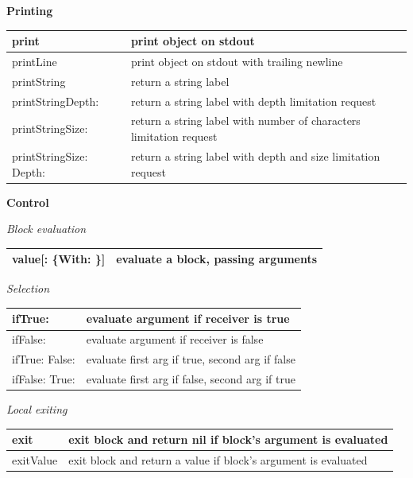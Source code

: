 \documentclass[letterpaper,10pt,english]{sphinxmanual}
\begin{document}
\textbf{Printing}

\begin{tabulary}{\linewidth}{p{5cm} p{10cm}}
\hline

print
 & 
print object on stdout
\\\hline

printLine
 & 
print object on stdout with trailing newline
\\\hline

printString
 & 
return a string label
\\\hline

printStringDepth:
 & 
return a string label with depth limitation request
\\\hline

printStringSize:
 & 
return a string label with number of characters limitation request
\\\hline

printStringSize: Depth:
 & 
return a string label with depth and size limitation request
\\\hline
\end{tabulary}


\textbf{Control}

\emph{Block evaluation}

\begin{tabulary}{\linewidth}{p{5cm} p{10cm}}
\hline

value{[}: \{With: \}{]}
 & 
evaluate a block, passing arguments
\\\hline
\end{tabulary}


\emph{Selection}

\begin{tabulary}{\linewidth}{p{5cm} p{10cm}}
\hline

ifTrue:
 & 
evaluate argument if receiver is true
\\\hline

ifFalse:
 & 
evaluate argument if receiver is false
\\\hline

ifTrue: False:
 & 
evaluate first arg if true, second arg if false
\\\hline

ifFalse: True:
 & 
evaluate first arg if false, second arg if true
\\\hline
\end{tabulary}


\emph{Local exiting}

\begin{tabulary}{\linewidth}{p{5cm} p{10cm}}
\hline

exit
 & 
exit block and return nil if block’s argument is evaluated
\\\hline

exitValue
 & 
exit block and return a value if block’s argument is evaluated
\\\hline
\end{tabulary}
\end{document}
